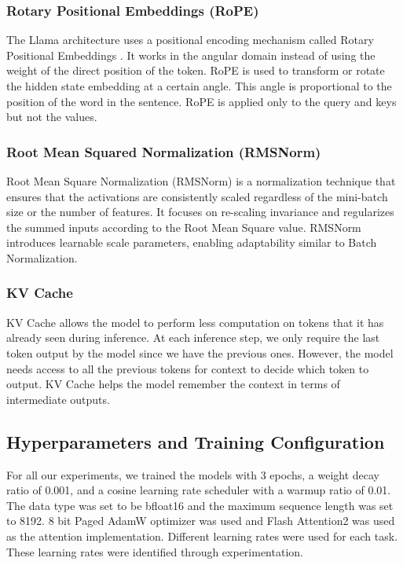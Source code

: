\subsubsection{Rotary Positional Embeddings (RoPE)}
The Llama architecture uses a positional encoding mechanism called Rotary Positional Embeddings \cite{su2024roformer}. It works in the angular domain instead of using the weight of the direct position of the token. RoPE is used to transform or rotate the hidden state embedding at a certain angle. This angle is proportional to the position of the word in the sentence. RoPE is applied only to the query and keys but not the values. 

\subsubsection{Root Mean Squared Normalization (RMSNorm)}
Root Mean Square Normalization (RMSNorm) \cite{zhang2019root} is a normalization technique that ensures that the activations are consistently scaled regardless of the mini-batch size or the number of features. It focuses on re-scaling invariance and regularizes the summed inputs according to the Root Mean Square value. RMSNorm introduces learnable scale parameters, enabling adaptability similar to Batch Normalization.

\subsubsection{KV Cache}
KV Cache allows the model to perform less computation on tokens that it has already seen during inference. At each inference step, we only require the last token output by the model since we have the previous ones. However, the model needs access to all the previous tokens for context to decide which token to output. KV Cache helps the model remember the context in terms of intermediate outputs.

\subsection{Hyperparameters and Training Configuration}
For all our experiments, we trained the models with 3 epochs, a weight decay ratio of 0.001, and a cosine learning rate scheduler with a warmup ratio of 0.01. The data type was set to be bfloat16 and the maximum sequence length was set to 8192. 8 bit Paged AdamW optimizer was used and Flash Attention2 was used as the attention implementation. Different learning rates were used for each task. These learning rates were identified through experimentation. 

